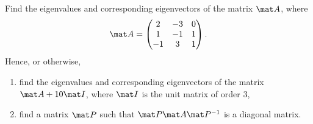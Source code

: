 \begin{problem}
    Find the eigenvalues and corresponding eigenvectors of the matrix $\mat A$, where \[\mat A = \begin{pmatrix}2 & -3 & 0 \\ 1 & - 1 & 1 \\ - 1 & 3 & 1\end{pmatrix}.\] Hence, or otherwise,
    \begin{enumerate}
        \item find the eigenvalues and corresponding eigenvectors of the matrix $\mat A + 10 \mat I$, where $\mat I$ is the unit matrix of order 3,
        \item find a matrix $\mat P$ such that $\mat P \mat A \mat P^{-1}$ is a diagonal matrix.
    \end{enumerate}
\end{problem}
